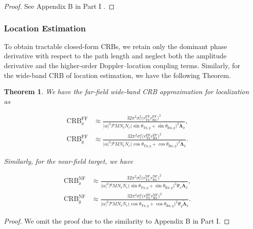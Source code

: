 \documentclass[9pt,final,journal,twocolumn]{IEEEtran}
\newtheorem{theorem}{Theorem}
\begin{document}
\begin{proof}
    See Appendix B in Part I \cite{wei2025PartI}.
\end{proof}

\subsubsection{Location Estimation}
To obtain tractable closed-form CRBs, we retain only the dominant phase derivative with respect to the path length and neglect both the amplitude derivative and the higher-order Doppler–location coupling terms. Similarly, for the wide-band CRB of location estimation, we have the following Theorem. 

\begin{theorem}
We have the far-field wide-band CRB approximation for localization as  
\begin{small}
\begin{subequations}
\label{CRB_loc_FF_NB}
\begin{align}
\mathrm{CRB}_{x}^{\mathrm{FF}}
&\approx
\frac{32\pi^2\sigma_r^2
\big(r_{\mathrm{Tx}}^{\mathrm{FF}}r_{\mathrm{Rx}}^{\mathrm{FF}}\big)^2}
{|\alpha|^2\mathcal PMN_tN_r
\Big(\sin\theta_{\mathrm{Tx},q}+\sin\theta_{\mathrm{Rx},q}\Big)^2
\widetilde{\bm\Lambda}_2},\\
\mathrm{CRB}_{y}^{\mathrm{FF}}
&\approx
\frac{32\pi^2\sigma_r^2
\big(r_{\mathrm{Tx}}^{\mathrm{FF}}r_{\mathrm{Rx}}^{\mathrm{FF}}\big)^2}
{|\alpha|^2\mathcal PMN_tN_r
\Big(\cos\theta_{\mathrm{Tx},q}+\cos\theta_{\mathrm{Rx},q}\Big)^2
\widetilde{\bm\Lambda}_2}.
\end{align}
\end{subequations}
\end{small}
Similarly, for the near-field target, we have 
\begin{small}
\begin{subequations}
\label{CRB_loc_NF_NB}
\begin{align}
\mathrm{CRB}_{x}^{\mathrm{NF}}
&\approx
\frac{32\pi^2\sigma_r^2
\big(r_{\mathrm{Tx}}^{\mathrm{NF}}r_{\mathrm{Rx}}^{\mathrm{NF}}\big)^2}
{|\alpha|^2\mathcal PMN_tN_r
\Big(\sin\theta_{\mathrm{Tx},q}+\sin\theta_{\mathrm{Rx},q}\Big)^2
\Psi_x\widetilde{\bm\Lambda}_2},\\
\mathrm{CRB}_{y}^{\mathrm{NF}}
&\approx
\frac{32\pi^2\sigma_r^2
\big(r_{\mathrm{Tx}}^{\mathrm{NF}}r_{\mathrm{Rx}}^{\mathrm{NF}}\big)^2}
{|\alpha|^2\mathcal PMN_tN_r
\Big(\cos\theta_{\mathrm{Tx},q}+\cos\theta_{\mathrm{Rx},q}\Big)^2
\Psi_y\widetilde{\bm\Lambda}_2}.
\end{align}
\end{subequations}
\end{small} 
\end{theorem}
\begin{proof}
    We omit the proof due to the similarity to Appendix B in Part I.
\end{proof}
\end{document}
